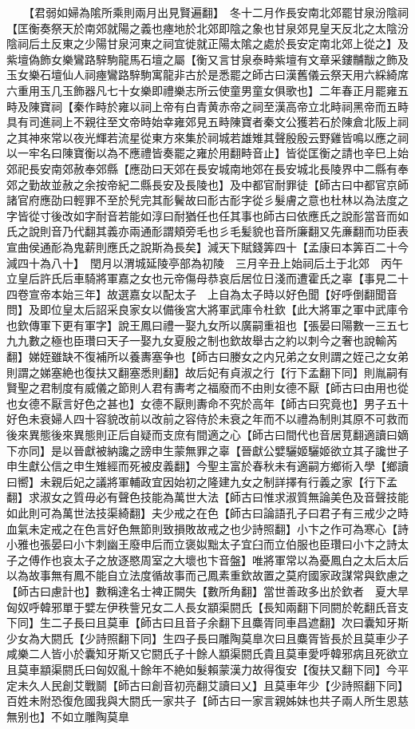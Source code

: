 　　【君弱如婦為隂所乘則兩月出見賢遍翻】　冬十二月作長安南北郊罷甘泉汾陰祠【匡衡奏祭天於南郊就陽之義也瘞地於北郊即陰之象也甘泉郊見皇天反北之太陰汾陰祠后土反東之少陽甘泉河東之祠宜徙就正陽太隂之處於長安定南北郊上從之】及紫壇偽飾女樂鸞路騂駒龍馬石壇之屬【衡又言甘泉泰畤紫壇有文章采鏤黼黻之飾及玉女樂石壇仙人祠瘞鸞路騂駒寓龍非古於是悉罷之師古曰漢舊儀云祭天用六綵綺席六重用玉几玉飾器凡七十女樂即禮樂志所云使童男童女俱歌也】二年春正月罷雍五畤及陳寶祠【秦作畤於雍以祠上帝有白青黄赤帝之祠至漢高帝立北畤祠黑帝而五畤具有司進祠上不親往至文帝時始幸雍郊見五畤陳寶者秦文公獲若石於陳倉北阪上祠之其神來常以夜光輝若流星從東方來集於祠城若雄雉其聲殷殷云野雞皆鳴以應之祠以一牢名曰陳寶衡以為不應禮皆奏罷之雍於用翻畤音止】皆從匡衡之請也辛巳上始郊祀長安南郊赦奉郊縣【應劭曰天郊在長安城南地郊在長安城北長陵界中二縣有奉郊之勤故並赦之余按帝紀二縣長安及長陵也】及中都官耐罪徒【師古曰中都官京師諸官府應劭曰輕罪不至於髠完其耏鬢故曰耏古耏字從彡髮膚之意也杜林以為法度之字皆從寸後改如字耐音若能如淳曰耐猶任也任其事也師古曰依應氏之說耏當音而如氏之說則音乃代翻其義亦兩通耏謂頬旁毛也彡毛髪貌也音所廉翻又先亷翻而功臣表宣曲侯通耏為鬼薪則應氏之說斯為長矣】減天下賦錢筭四十【孟康曰本筭百二十今減四十為八十】　閏月以渭城延陵亭部為初陵　三月辛丑上始祠后土于北郊　丙午立皇后許氏后車騎將軍嘉之女也元帝傷母恭哀后居位日淺而遭霍氏之辜【事見二十四卷宣帝本始三年】故選嘉女以配太子　上自為太子時以好色聞【好呼倒翻聞音問】及即位皇太后詔采良家女以備後宮大將軍武庫令杜欽【此大將軍之軍中武庫令也欽傳軍下更有軍字】說王鳳曰禮一娶九女所以廣嗣重祖也【張晏曰陽數一三五七九九數之極也臣瓚曰天子一娶九女夏殷之制也欽故舉古之約以刺今之奢也說輸芮翻】娣姪雖缺不復補所以養夀塞争也【師古曰媵女之内兄弟之女則謂之姪己之女弟則謂之娣塞絶也復扶又翻塞悉則翻】故后妃有貞淑之行【行下孟翻下同】則胤嗣有賢聖之君制度有威儀之節則人君有夀考之福廢而不由則女德不厭【師古曰由用也從也女德不厭言好色之甚也】女德不厭則夀命不究於高年【師古曰究竟也】男子五十好色未衰婦人四十容貌改前以改前之容侍於未衰之年而不以禮為制則其原不可救而後來異態後來異態則正后自疑而支庶有間適之心【師古曰間代也音居莧翻適讀曰嫡下亦同】是以晉獻被納讒之謗申生蒙無罪之辜【晉獻公嬖驪姬驪姬欲立其子讒世子申生獻公信之申生雉經而死被皮義翻】今聖主富於春秋未有適嗣方鄉術入學【鄉讀曰嚮】未親后妃之議將軍輔政宜因始初之隆建九女之制詳擇有行義之家【行下孟翻】求淑女之質毋必有聲色技能為萬世大法【師古曰惟求淑質無論美色及音聲技能如此則可為萬世法技渠綺翻】夫少戒之在色【師古曰論語孔子曰君子有三戒少之時血氣未定戒之在色言好色無節則致損敗故戒之也少詩照翻】小卞之作可為寒心【詩小雅也張晏曰小卞刺幽王廢申后而立褒姒黜太子宜臼而立伯服也臣瓚曰小卞之詩太子之傅作也哀太子之放逐愍周室之大壞也卞音盤】唯將軍常以為憂鳳白之太后太后以為故事無有鳳不能自立法度循故事而己鳳素重欽故置之莫府國家政謀常與欽慮之【師古曰慮計也】數稱達名士裨正闕失【數所角翻】當世善政多出於欽者　夏大旱　匈奴呼韓邪單于嬖左伊秩訾兄女二人長女顓渠閼氏【長知兩翻下同閼於乾翻氏音支下同】生二子長曰且莫車【師古曰且音子余翻下且麋胥同車昌遮翻】次曰囊知牙斯少女為大閼氏【少詩照翻下同】生四子長曰雕陶莫臯次曰且麋胥皆長於且莫車少子咸樂二人皆小於囊知牙斯又它閼氏子十餘人顓渠閼氏貴且莫車愛呼韓邪病且死欲立且莫車顓渠閼氏曰匈奴亂十餘年不絶如髮賴蒙漢力故得復安【復扶又翻下同】今平定未久人民創艾戰鬬【師古曰創音初亮翻艾讀曰乂】且莫車年少【少詩照翻下同】百姓未附恐復危國我與大閼氏一家共子【師古曰一家言親姊妹也共子兩人所生恩慈無别也】不如立雕陶莫臯